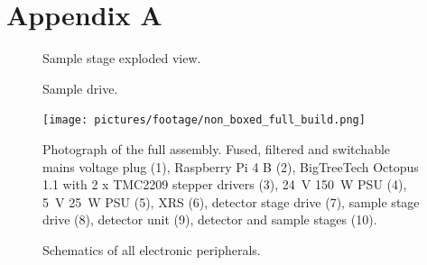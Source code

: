\chapter{Appendix A}\label{sec:appendix a}
    \begin{figure}[h]
        \centering
        \caption[Sample stage exploded view.]{Sample stage exploded view.}%
        \label{fig:sample stage exploded}%
    \end{figure}
    \newpage
    \begin{figure}[h]
        \centering
        \caption[Sample drive.]{Sample drive.}%
        \label{fig:sample drive}%
    \end{figure}
    \newpage
    \begin{figure}[h]
        \centering
        \texttt{[image: pictures/footage/non\_boxed\_full\_build.png]}
        \caption[Photograph of the full assembly]{Photograph of the full assembly. Fused, filtered and switchable mains voltage plug (1), Raspberry Pi 4 B (2), BigTreeTech Octopus 1.1 with 2 x TMC2209 stepper drivers (3), \qty{24}{\volt} \qty{150}{\watt} PSU (4), \qty{5}{\volt} \qty{25}{\watt} PSU (5), XRS (6), detector stage drive (7), sample stage drive (8), detector unit (9), detector and sample stages (10).}%
        \label{fig:non boxed full assembly}
    \end{figure}
    \newpage
    \begin{figure}[h]
        \centering
        
        \caption[Schematics of all electronic peripherals]{Schematics of all electronic peripherals.}%
        \label{fig:schematics of peripherals}
    \end{figure}
    \newpage
